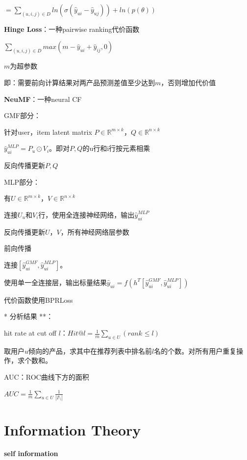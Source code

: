 \documentclass[UTF8]{ctexart}
\begin{document}
  \quad \quad \quad $ = \sum_{(u, i, j) \in D} ln(\sigma(\hat{y}_{ui} - \hat{y}_{uj})) + ln(p(\theta))$

  \textbf{Hinge Loss}：一种pairwise ranking代价函数

  \quad $\sum_{(u, i, j) \in D} max(m - \hat{y}_{ui} + \hat{y}_{ij}, 0)$

  \quad \quad $m$为超参数

  \quad \quad 即：需要前向计算结果对两产品预测差值至少达到$m$，否则增加代价值

  \textbf{NeuMF}：一种neural CF

  \quad GMF部分：

  \quad \quad 针对user，item latent matrix $P \in \mathbb{R}^{m \times k}$，$Q \in \mathbb{R}^{n \times k}$

  \quad \quad $\hat{y}_{ui}^{MLP} = P_u \odot V_i$。即对$P, Q$的u行和i行按元素相乘
  
  \quad \quad 反向传播更新$P, Q$

  \quad MLP部分：

  \quad \quad 有$U \in \mathbb{R}^{m \times k}$，$V \in \mathbb{R}^{n \times k}$

  \quad \quad 连接$U_u$和$V_i$行，使用全连接神经网络，输出$\hat{y}_{ui}^{MLP}$

  \quad \quad 反向传播更新$U$，$V$，所有神经网络层参数

  \quad 前向传播

  \quad \quad 连接$[\hat{y}_{ui}^{GMF}, \hat{y}_{ui}^{MLP}]$。
  
  \quad \quad 使用单一全连接层，输出标量结果$\hat{y}_{ui} = f(h^T[\hat{y}_{ui}^{GMF}, \hat{y}_{ui}^{MLP}])$

  \quad 代价函数使用BPRLoss

  \quad ** 分析结果 **：

  \quad \quad hit rate at cut off $l$：$Hit @ l = \frac{1}{m}\sum_{u \in U}(rank_{} \leq l)$

  \quad \quad \quad 取用户$u$倾向的产品，求其中在推荐列表中排名前$l$名的个数。对所有用户重复操作，求个数和。

  \quad \quad AUC：ROC曲线下方的面积

  \quad \quad \quad $AUC = \frac{1}{m}\sum_{u \in U}\frac{1}{|I \setminus |}$
  
\section{Information Theory}
\noindent \textbf{self information}
\end{document}
